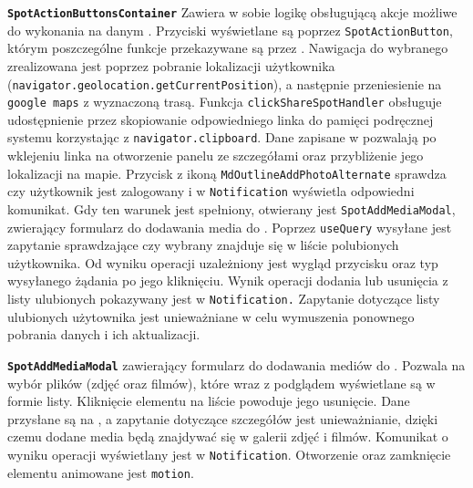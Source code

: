 \textbf{\texttt{SpotActionButtonsContainer}}
Zawiera w sobie logikę obsługującą akcje możliwe do wykonania na danym .
Przyciski wyświetlane są poprzez \newline \texttt{SpotActionButton}, którym poszczególne funkcje przekazywane są
przez .
Nawigacja do wybranego  zrealizowana jest poprzez pobranie lokalizacji użytkownika
\\ (\texttt{navigator.geolocation.getCurrentPosition}), a następnie przeniesienie na \\ \texttt{google maps}
z wyznaczoną trasą.
Funkcja \texttt{clickShareSpotHandler} obsługuje udostępnienie  przez
skopiowanie odpowiedniego linka do pamięci podręcznej systemu korzystając z \newline \texttt{navigator.clipboard}.
Dane zapisane w  pozwalają po wklejeniu linka na otworzenie
panelu ze szczegółami  oraz przybliżenie jego lokalizacji na mapie.
Przycisk z ikoną \texttt{MdOutlineAddPhotoAlternate} sprawdza czy użytkownik jest zalogowany i w
 \newline \texttt{Notification} wyświetla odpowiedni komunikat.
Gdy ten warunek jest spełniony, otwierany jest  \newline \texttt{SpotAddMediaModal}, zwierający
formularz do dodawania media do .
Poprzez  \texttt{useQuery} wysyłane jest zapytanie sprawdzające czy wybrany 
znajduje się w liście polubionych użytkownika.
Od wyniku operacji uzależniony jest wygląd przycisku oraz typ wysyłanego żądania po jego kliknięciu.
Wynik operacji dodania lub usunięcia  z listy ulubionych pokazywany jest w
 \texttt{Notification.}
Zapytanie dotyczące listy ulubionych  użytownika jest unieważniane w celu
wymuszenia ponownego pobrania danych i ich aktualizacji.

\textbf{\texttt{SpotAddMediaModal}}
 zawierający formularz do dodawania mediów do .
Pozwala na wybór plików (zdjęć oraz filmów), które wraz z podglądem wyświetlane są w formie listy.
Kliknięcie elementu na liście powoduje jego usunięcie.
Dane przysłane są  na , a zapytanie dotyczące
szczegółów  jest unieważnianie, dzięki czemu dodane media będą znajdywać się w
galerii zdjęć i filmów.
Komunikat o wyniku operacji wyświetlany jest w \texttt{Notification}.
Otworzenie oraz zamknięcie elementu animowane jest  \texttt{motion}.

